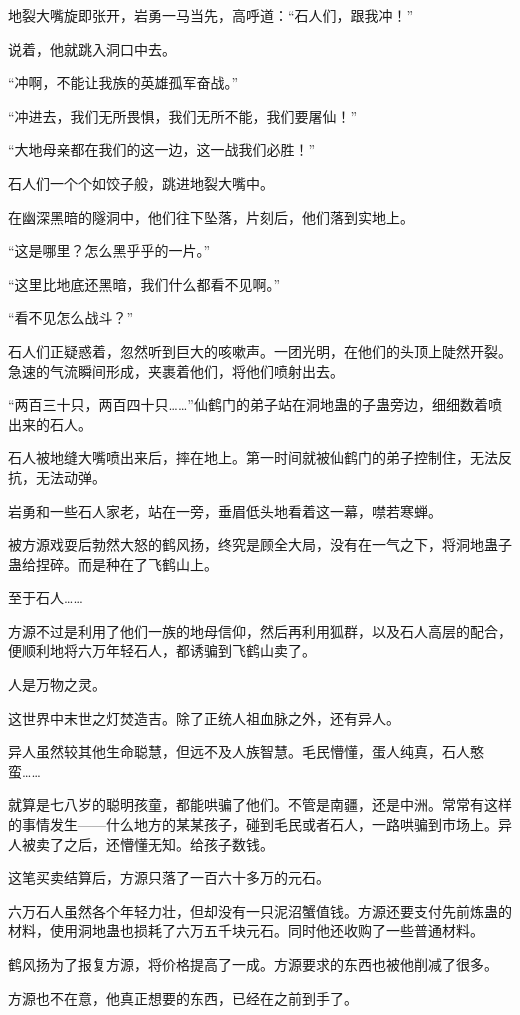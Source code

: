 \begin{this_body}
地裂大嘴旋即张开，岩勇一马当先，高呼道：“石人们，跟我冲！”

说着，他就跳入洞口中去。

“冲啊，不能让我族的英雄孤军奋战。”

“冲进去，我们无所畏惧，我们无所不能，我们要屠仙！”

“大地母亲都在我们的这一边，这一战我们必胜！”

石人们一个个如饺子般，跳进地裂大嘴中。

在幽深黑暗的隧洞中，他们往下坠落，片刻后，他们落到实地上。

“这是哪里？怎么黑乎乎的一片。”

“这里比地底还黑暗，我们什么都看不见啊。”

“看不见怎么战斗？”

石人们正疑惑着，忽然听到巨大的咳嗽声。一团光明，在他们的头顶上陡然开裂。急速的气流瞬间形成，夹裹着他们，将他们喷射出去。

“两百三十只，两百四十只……”仙鹤门的弟子站在洞地蛊的子蛊旁边，细细数着喷出来的石人。

石人被地缝大嘴喷出来后，摔在地上。第一时间就被仙鹤门的弟子控制住，无法反抗，无法动弹。

岩勇和一些石人家老，站在一旁，垂眉低头地看着这一幕，噤若寒蝉。

被方源戏耍后勃然大怒的鹤风扬，终究是顾全大局，没有在一气之下，将洞地蛊子蛊给捏碎。而是种在了飞鹤山上。

至于石人……

方源不过是利用了他们一族的地母信仰，然后再利用狐群，以及石人高层的配合，便顺利地将六万年轻石人，都诱骗到飞鹤山卖了。

人是万物之灵。

这世界中末世之灯焚造吉。除了正统人祖血脉之外，还有异人。

异人虽然较其他生命聪慧，但远不及人族智慧。毛民懵懂，蛋人纯真，石人憨蛮……

就算是七八岁的聪明孩童，都能哄骗了他们。不管是南疆，还是中洲。常常有这样的事情发生——什么地方的某某孩子，碰到毛民或者石人，一路哄骗到市场上。异人被卖了之后，还懵懂无知。给孩子数钱。

这笔买卖结算后，方源只落了一百六十多万的元石。

六万石人虽然各个年轻力壮，但却没有一只泥沼蟹值钱。方源还要支付先前炼蛊的材料，使用洞地蛊也损耗了六万五千块元石。同时他还收购了一些普通材料。

鹤风扬为了报复方源，将价格提高了一成。方源要求的东西也被他削减了很多。

方源也不在意，他真正想要的东西，已经在之前到手了。


\end{this_body}
